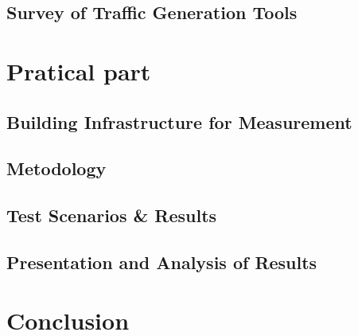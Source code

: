 \section{Survey of Traffic Generation Tools}


\chapter{Pratical part}

\section{Building Infrastructure for Measurement}


\section{Metodology}


\section{Test Scenarios \& Results}


\section{Presentation and Analysis of Results}


\chapter{Conclusion}


